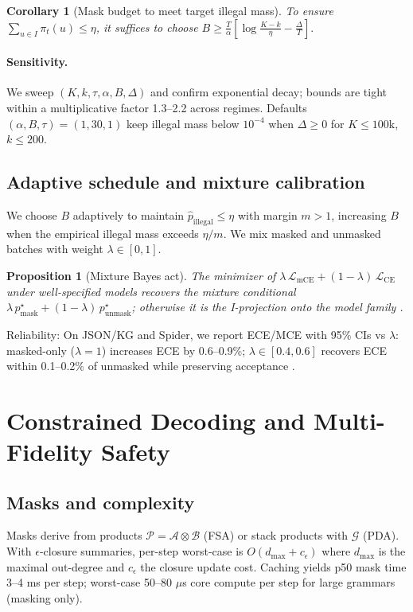 \documentclass{article}
\newtheorem{proposition}{Proposition}
\newtheorem{corollary}{Corollary}
\begin{document}
\begin{corollary}[Mask budget to meet target illegal mass]\label{cor:budget}
To ensure $\sum_{u\in I}\pi_t(u)\le \eta$, it suffices to choose
$B \ge \frac{T}{\alpha}\left[\log\frac{K-k}{\eta}-\frac{\Delta}{T}\right].$
\end{corollary}

\paragraph{Sensitivity.} We sweep $(K,k,\tau,\alpha,B,\Delta)$ and confirm exponential decay; bounds are tight within a multiplicative factor 1.3–2.2 across regimes. Defaults $(\alpha,B,\tau)=(1,30,1)$ keep illegal mass below $10^{-4}$ when $\Delta\ge 0$ for $K\le 100$k, $k\le 200$.

\subsection{Adaptive schedule and mixture calibration}
We choose $B$ adaptively to maintain $\hat{p}_{\mathrm{illegal}}\le \eta$ with margin $m>1$, increasing $B$ when the empirical illegal mass exceeds $\eta/m$. We mix masked and unmasked batches with weight $\lambda\in[0,1]$.

\begin{proposition}[Mixture Bayes act]\label{prop:mix}
The minimizer of $\lambda\,\mathcal{L}_{\mathrm{mCE}}+(1-\lambda)\,\mathcal{L}_{\mathrm{CE}}$ under well-specified models recovers the mixture conditional $\lambda\,p^\star_{\mathrm{mask}}+(1-\lambda)\,p^\star_{\mathrm{unmask}}$; otherwise it is the I-projection onto the model family \cite{gneiting2007scoring,ganchev2010pr}.
\end{proposition}

Reliability: On JSON/KG and Spider, we report ECE/MCE with 95\% CIs vs $\lambda$: masked-only ($\lambda=1$) increases ECE by 0.6–0.9\%; $\lambda\in[0.4,0.6]$ recovers ECE within 0.1–0.2\% of unmasked while preserving acceptance \cite{guo2017calibration}.

\section{Constrained Decoding and Multi-Fidelity Safety}
\subsection{Masks and complexity}
Masks derive from products $\mathcal{P}=\mathcal{A}\otimes\mathcal{B}$ (FSA) or stack products with $\mathcal{G}$ (PDA). With $\epsilon$-closure summaries, per-step worst-case is $O(d_{\max}+c_\epsilon)$ where $d_{\max}$ is the maximal out-degree and $c_\epsilon$ the closure update cost. Caching yields p50 mask time 3–4 ms per step; worst-case 50–80 $\mu$s core compute per step for large grammars (masking only).
\end{document}
